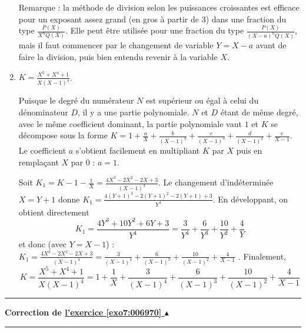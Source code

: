 \documentclass[11pt,a4paper]{article}
\newcounter{exo}
\newcommand{\correction}[1]{\hypertarget{cor7:#1}{}\label{cor7:#1}{\bf Correction de \hyperlink{exo7:#1}{l'exercice \ref{exo7:#1} $\blacktriangle$}}\vspace{1mm}\hrule\vspace{1mm}}
\newcommand{\fincorrection}{\vspace{1mm}\hrule\vspace*{7mm}}
\begin{document}
\begin{enumerate}
\medskip
Remarque : la méthode de division selon les puissances croissantes est 
efficace pour un exposant assez grand (en gros
à partir de $3$) dans une fraction du type $\frac{P(X)}{X^n Q(X)}$. 
Elle peut être utilisée pour une fraction du type 
$\frac{P(X)}{(X-a)^nQ(X)}$, mais il faut commencer par le changement de variable
$Y=X-a$ avant de faire la division, puis bien entendu revenir à la
variable $X$.


\item $K=\frac{X^5+X^4+1}{X(X-1)^4}$.

Puisque le degré du numérateur $N$ est supérieur ou égal à celui du dénominateur $D$, 
il y a une partie polynomiale.
$N$ et $D$ étant de même degré, avec le même coefficient dominant, 
la partie polynomiale vaut $1$ et $K$ se décompose sous la forme 
$K = 1+\frac{a}{X} + \frac{b}{(X-1)^4} + \frac{c}{(X-1)^3} + \frac{d}{(X-1)^2} + \frac{e}{X-1}$. 
Le coefficient $a$ s'obtient facilement en multipliant $K$ par $X$ puis en remplaçant $X$ par $0$ : $a=1$. 

Soit $K_1=K-1-\frac{1}{X}=\frac{4X^3-2X^2-2X+3}{(X-1)^4}$. Le changement d'indéterminée $X=Y+1$ donne 
$K_1=\frac{4(Y+1)^3-2(Y+1)^2-2(Y+1)+3}{Y^4} $. En développant, on obtient directement
$$K_1=\frac{4Y^3+10Y^2+6Y+3}{Y^4}= \frac{3}{Y^4} + \frac{6}{Y^3} + 
\frac{10}{Y^2} + \frac{4}{Y}$$
et donc (avec $Y=X-1$) :
$K_1=\frac{4X^3-2X^2-2X+3}{(X-1)^4}=\frac{3}{(X-1)^4} + \frac{6}{(X-1)^3} + 
\frac{10}{(X-1)^2} + \frac{4}{X-1}$ .
Finalement,
$$K = \frac{X^5+X^4+1}{X(X-1)^4} = 1 + \frac{1}{X} + \frac{3}{(X-1)^4} + \frac{6}{(X-1)^3} + 
\frac{10}{(X-1)^2} + \frac{4}{X-1}$$
\end{enumerate}
\fincorrection
\correction{006970}\
\end{document}
